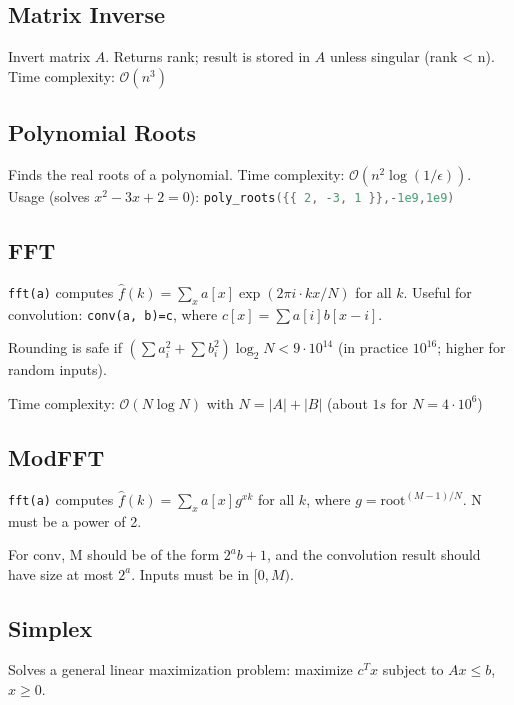 \documentclass{article}
\begin{document}
\subsection*{Matrix Inverse}
Invert matrix $A$. Returns rank; result is stored in $A$ unless singular (rank < n). Time complexity: $\mathcal{O}(n^3)$


\subsection*{Polynomial Roots}
Finds the real roots of a polynomial. Time complexity: $\mathcal{O}(n^2 \log(1/\epsilon))$.\\
Usage (solves $x^2-3x+2 = 0$): \lstinline[language=cpp]|poly_roots({{ 2, -3, 1 }},-1e9,1e9)|


\vspace*{-0.3cm}

\subsection*{FFT}
\lstinline{fft(a)} computes $\hat f(k) = \sum_x a[x] \exp(2\pi i \cdot k x / N)$ for all $k$.
Useful for convolution: \lstinline{conv(a, b)=c}, where $c[x] = \sum a[i]b[x-i]$.

Rounding is safe if $(\sum a_i^2 + \sum b_i^2)\log_2{N} < 9\cdot10^{14}$
(in practice $10^{16}$; higher for random inputs).

Time complexity: $\mathcal{O}(N \log N)$ with $N = |A|+|B|$ (about $1s$ for $N=4 \cdot 10^6$)


\newpage

\subsection*{ModFFT}
\lstinline{fft(a)} computes $\hat f(k) = \sum_x a[x] g^{xk}$ for all $k$, where $g=\text{root}^{(M-1)/N}$. N must be a power of 2.

For conv, M should be of the form $2^a b+1$, and the convolution result should have size at most $2^a$. Inputs must be in $[0,M)$.



\subsection*{Simplex}
Solves a general linear maximization problem: maximize $c^T x$ subject to $Ax \le b$, $x \ge 0$.
\end{document}
